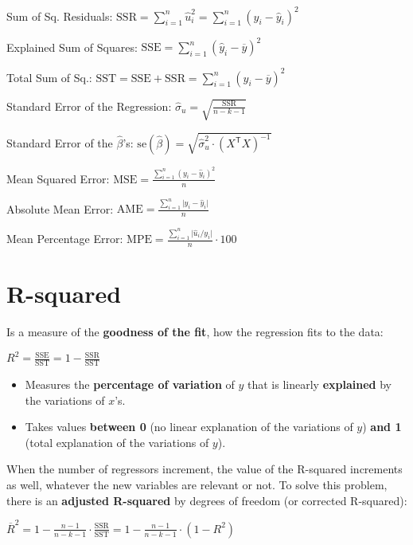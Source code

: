 \documentclass[10pt, a4paper, landscape]{extarticle}
\newcommand{\se}{\mathrm{se}}
\newcommand{\SSR}{\mathrm{SSR}}
\newcommand{\SSE}{\mathrm{SSE}}
\newcommand{\SST}{\mathrm{SST}}
\newcommand{\tr}{\mathsf{T}}
\begin{document}
\begin{multicols}{3}
Sum of Sq. Residuals: \hfill $\SSR = \sum_{i=1}^n \hat{u}_i^2 = \sum_{i=1}^n (y_i - \hat{y}_i)^2$

Explained Sum of Squares: \hfill $\SSE = \sum_{i=1}^n (\hat{y}_i - \overline{y})^2$

Total Sum of Sq.: \hfill $\SST = \SSE + \SSR = \sum_{i=1}^n (y_i - \overline{y})^2$

Standard Error of the Regression: \hfill $\hat{\sigma}_u = \sqrt{\frac{\SSR}{n - k - 1}}$

Standard Error of the $\hat{\beta}$'s: \hfill $\se(\hat{\beta}) = \sqrt{\hat{\sigma}^2_u \cdot (X^\tr X)^{-1}}$

Mean Squared Error: \hfill $\mathrm{MSE} = \frac{\sum_{i=1}^n (y_i - \hat{y}_i)^2}{n}$

Absolute Mean Error: \hfill $\mathrm{AME} = \frac{\sum_{i=1}^n \lvert y_i - \hat{y}_i \rvert}{n}$

Mean Percentage Error: \hfill $\mathrm{MPE} = \frac{\sum_{i=1}^n \lvert \hat{u}_i / y_i \rvert}{n} \cdot 100$

\columnbreak

\section*{R-squared}

Is a measure of the \textbf{goodness of the fit}, how the regression fits to the data:

\begin{center}
	$R^2 = \frac{\SSE}{\SST} = 1 - \frac{\SSR}{\SST}$
\end{center}

\begin{itemize}[leftmargin=*]
	\item Measures the \textbf{percentage of variation} of $y$ that is linearly \textbf{explained} by the variations of $x$'s.
	\item Takes values \textbf{between 0} (no linear explanation of the variations of $y$) \textbf{and 1} (total explanation of the variations of $y$).
\end{itemize}

When the number of regressors increment, the value of the R-squared increments as well, whatever the new variables are relevant or not. To solve this problem, there is an \textbf{adjusted R-squared} by degrees of freedom (or corrected R-squared):

\begin{center}
	$\overline{R}^2 = 1 - \frac{n - 1}{n - k - 1} \cdot \frac{\SSR}{\SST} = 1 - \frac{n - 1}{n - k - 1} \cdot (1 - R^2)$
\end{center}


\end{multicols}
\end{document}
